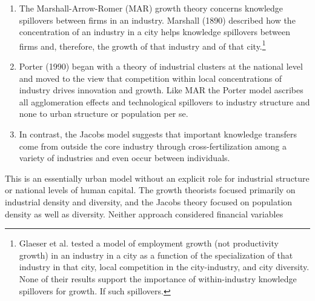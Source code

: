\begin{enumerate}
\item The Marshall-Arrow-Romer (MAR) growth theory concerns knowledge spillovers between firms in an industry.  Marshall (1890) described how the concentration of an industry in a city helps knowledge spillovers between firms and, therefore, the growth of that industry and of that city.\footnote{Glaeser et al. \cite{glaeserGrowthCities1991} tested a model of employment growth (not productivity growth) in an industry in a city as a function of the specialization of that industry in that city, local competition in the city-industry, and city diversity. None of their results support the importance of within-industry knowledge spillovers for growth. If such spillovers. %
}

\item  Porter (1990) began with a theory of industrial clusters at the national level and moved to the view that competition within local concentrations of industry drives innovation and growth. Like MAR the Porter model ascribes all agglomeration effects and technological spillovers to industry structure and none to urban structure or population per se.  

\item  In contrast, the \gls{Jacobs model} %
suggests that important knowledge transfers come from outside the core industry through cross-fertilization among a variety of industries and even occur between individuals.
\end{enumerate}

This is an essentially urban model without an explicit role for industrial structure or national levels of human capital.  The growth theorists focused primarily on industrial density and diversity, and the Jacobs theory focused on population density as well as diversity. Neither approach considered financial variables


